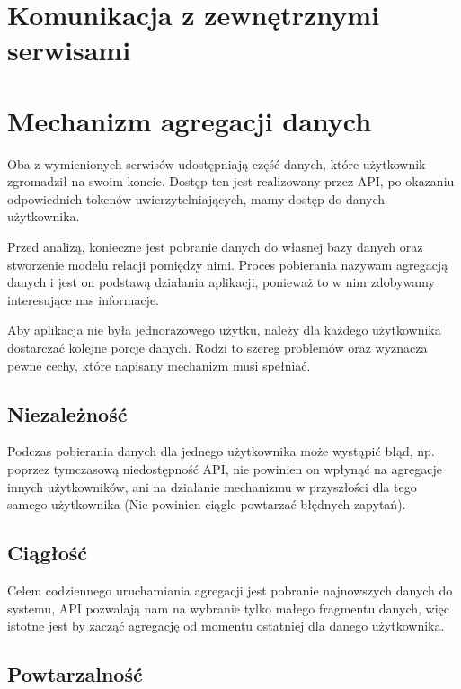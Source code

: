 \documentclass[brudnopis]{xmgr}
\begin{document}
        \section*{Komunikacja z zewnętrznymi serwisami}

    \section{Mechanizm agregacji danych}

        Oba z wymienionych serwisów udostępniają część danych, które użytkownik zgromadził na swoim koncie.
        Dostęp ten jest realizowany przez API, po okazaniu odpowiednich tokenów uwierzytelniających, mamy dostęp do danych użytkownika.

        Przed analizą, konieczne jest pobranie danych do własnej bazy danych oraz stworzenie modelu relacji pomiędzy nimi.
        Proces pobierania nazywam agregacją danych i jest on podstawą działania aplikacji,
        ponieważ to w nim zdobywamy interesujące nas informacje.

        Aby aplikacja nie była jednorazowego użytku, należy dla każdego użytkownika dostarczać kolejne porcje danych.
        Rodzi to szereg problemów oraz wyznacza pewne cechy, które napisany mechanizm musi spełniać.

        \subsection*{Niezależność}
        Podczas pobierania danych dla jednego użytkownika może wystąpić błąd, np. poprzez tymczasową niedostępność API,
        nie powinien on wpłynąć na agregacje innych użytkowników, ani na działanie mechanizmu w przyszłości dla tego samego użytkownika
        (Nie powinien ciągle powtarzać błędnych zapytań).

        \subsection*{Ciągłość}
        Celem codziennego uruchamiania agregacji jest pobranie najnowszych danych do systemu,
        API pozwalają nam na wybranie tylko małego fragmentu danych, więc istotne jest by zacząć agregację od momentu ostatniej
        dla danego użytkownika.

        \subsection*{Powtarzalność}
\end{document}
